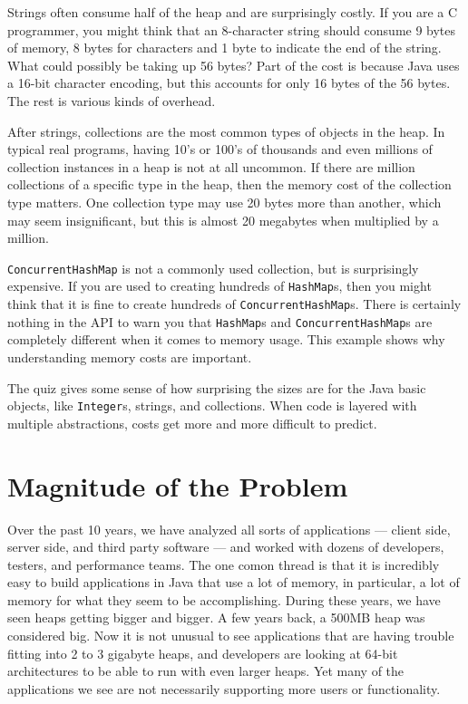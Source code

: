 Strings often consume half of the heap and are surprisingly costly. If you are a C programmer, you might think that an 8-character string should consume 9 bytes of memory, 8 bytes for characters and 1 byte to indicate the end of the string. What could possibly be taking up 56 bytes? Part of the cost is because Java uses a 16-bit character encoding, but this accounts for only 16 bytes of the 56 bytes. The rest is various kinds of overhead.

After strings, collections are the most common types of objects in the heap. In typical real programs, having 10's or 100's of thousands and even millions of collection instances in a heap is not at all uncommon. If there are million collections of a specific type in the heap, then the memory cost of the collection type matters. One collection type may use 20 bytes more than another, which may seem insignificant, but this is almost 20 megabytes when multiplied by a million.

\texttt{ConcurrentHashMap} is not a commonly used collection, but is surprisingly expensive. If you are used to creating hundreds of \texttt{HashMap}s, then you might think that it is fine to create hundreds of \texttt{ConcurrentHashMap}s. There is certainly nothing in the API to warn you that \texttt{HashMap}s and \texttt{ConcurrentHashMap}s are completely different when it comes to memory usage. This example shows why understanding memory costs are important.

The quiz gives some sense of how surprising the sizes are for the Java basic objects, like \texttt{Integer}s, strings, and collections. When code is layered with multiple abstractions, costs get more and more difficult to predict.


\section{Magnitude of the Problem}

Over the past 10 years, we have analyzed all sorts of applications --- client side, server side, and third party software --- and worked with dozens of developers, testers, and performance teams. The one comon thread is that it is incredibly easy to build applications in Java that use a lot of memory, in particular, a lot of memory for what they seem to be accomplishing. During these years, we have seen heaps getting bigger and bigger. A few years back, a 500MB heap was considered big. Now it is not unusual to see applications that are having trouble fitting into 2 to 3 gigabyte heaps, and developers are looking at 64-bit architectures to be able to run with even larger heaps. Yet many of the applications we see are not necessarily supporting more users or functionality. 

